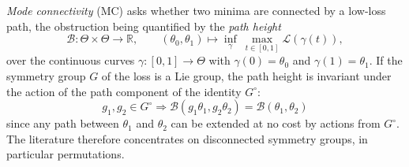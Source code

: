 \documentclass[mathematics,review,submit,moreauthors]{Definitions/mdpi}
\begin{document}
\emph{Mode connectivity} (MC) \citep{garipov2018,draxler2018p3icml} asks whether two minima are connected by a low-loss path, the obstruction being quantified by the \emph{path height}
\begin{equation}\label{eq:path-height}
    \mathcal{B}:\Theta\times\Theta\to\mathbb{R},\qquad(\theta_0,\theta_1)\longmapsto\inf_{\gamma}\ \max_{t\in[0,1]}\mathcal{L}(\gamma(t)),
\end{equation}
over the continuous curves $\gamma:[0,1]\to\Theta$ with $\gamma(0)=\theta_0$ and $\gamma(1)=\theta_1$.
If the symmetry group $G$ of the loss is a Lie group, the path height is invariant under the action of the path component \citep{baker2003} of the identity $G^{\circ}$:
$$
    g_1, g_2\in G^{\circ} \Rightarrow \mathcal{B}(g_1\theta_1, g_2\theta_2)=\mathcal{B}(\theta_1, \theta_2)
$$
since any path between $\theta_1$ and $\theta_2$ can be extended at no cost by actions from $G^{\circ}$.
The literature therefore concentrates on disconnected symmetry groups, in particular permutations.
\end{document}
